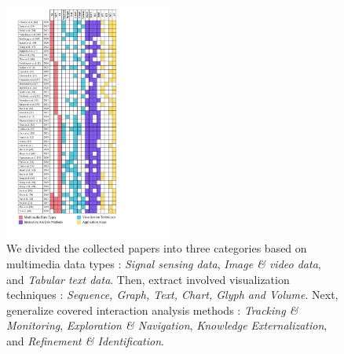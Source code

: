 \documentclass[a4paper,fleqn]{cas-dc}
\begin{document}
\begin{figure}[pos=!h]
	\centering
	\includegraphics[width=0.49\textwidth]{Images/table.pdf}
	\caption{
		We divided the collected papers into three categories based on multimedia data types  : \textit{Signal sensing data}, \textit{Image \& video data}, and \textit{Tabular text data}.
		Then, extract involved visualization techniques : \textit{Sequence, Graph, Text, Chart, Glyph and Volume}.
		Next, generalize covered interaction analysis methods : \textit{Tracking \& Monitoring}, \textit{Exploration \& Navigation}, \textit{Knowledge Externalization}, and \textit{Refinement \& Identification}.
}
\end{figure}
\end{document}
